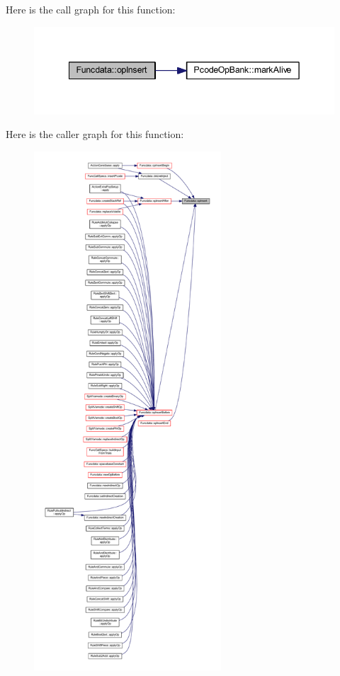 Here is the call graph for this function\+:
\nopagebreak
\begin{figure}[H]
\begin{center}
\leavevmode
\includegraphics[width=342pt]{class_funcdata_a6b77ee6442d79ae754d5dcf0b5318fca_cgraph}
\end{center}
\end{figure}
Here is the caller graph for this function\+:
\nopagebreak
\begin{figure}[H]
\begin{center}
\leavevmode
\includegraphics[height=550pt]{class_funcdata_a6b77ee6442d79ae754d5dcf0b5318fca_icgraph}
\end{center}
\end{figure}
\mbox{\label{class_funcdata_a3320ad92e11a48a06e21b8a55395a56b}} 
